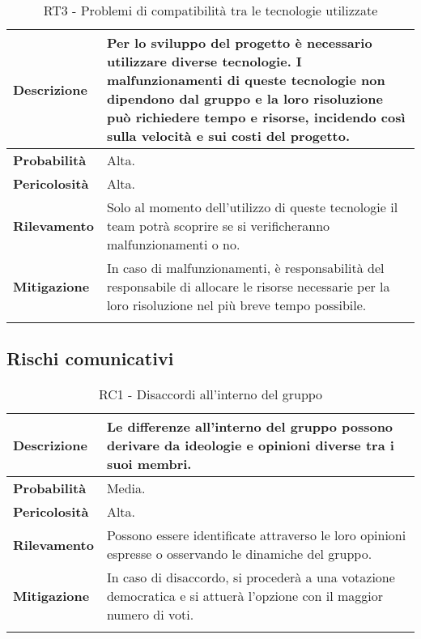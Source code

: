 \begin{longtable}{ | l | p{12cm} | }
    \hline
    \textbf{Descrizione} & Per lo sviluppo del progetto è necessario utilizzare diverse tecnologie. I malfunzionamenti di queste tecnologie non dipendono dal gruppo e la loro risoluzione può richiedere tempo e risorse, incidendo così sulla velocità e sui costi del progetto. \\
    \hline
    \textbf{Probabilità} & Alta. \\
    \hline
    \textbf{Pericolosità} & Alta. \\
    \hline
    \textbf{Rilevamento} & Solo al momento dell'utilizzo di queste tecnologie il team potrà scoprire se si verificheranno malfunzionamenti o no.  \\
    \hline
    \textbf{Mitigazione} & In caso di malfunzionamenti, è responsabilità del responsabile di allocare le risorse necessarie per la loro risoluzione nel più breve tempo possibile.\\
    \hline
    \caption{RT3 - Problemi di compatibilità tra le tecnologie utilizzate}
    \label{table:7}
\end{longtable}


\newpage


\subsection{Rischi comunicativi}
\begin{longtable}{ | l | p{12cm} | }
    \hline
    \textbf{Descrizione} & Le differenze all'interno del gruppo possono derivare da ideologie e opinioni diverse tra i suoi membri. \\
    \hline
    \textbf{Probabilità} & Media. \\
    \hline
    \textbf{Pericolosità} & Alta. \\
    \hline
    \textbf{Rilevamento} & Possono essere identificate attraverso le loro opinioni espresse o osservando le dinamiche del gruppo. \\
    \hline
    \textbf{Mitigazione} & In caso di disaccordo, si procederà a una votazione democratica e si attuerà l'opzione con il maggior numero di voti. \\
    \hline
    \caption{RC1 - Disaccordi all'interno del gruppo}
    \label{table:8}
\end{longtable}

